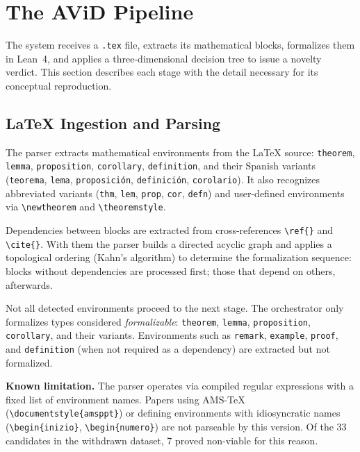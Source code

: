 \section{The AViD Pipeline}

\label{sec:pipeline}

The system receives a \texttt{.tex} file, extracts its mathematical blocks, formalizes them in Lean~4, and applies a three-dimensional decision tree to issue a novelty verdict. This section describes each stage with the detail necessary for its conceptual reproduction.

\subsection{LaTeX Ingestion and Parsing}

The parser extracts mathematical environments from the LaTeX source: \texttt{theorem}, \texttt{lemma}, \texttt{proposition}, \texttt{corollary}, \texttt{definition}, and their Spanish variants (\texttt{teorema}, \texttt{lema}, \texttt{proposición}, \texttt{definición}, \texttt{corolario}). It also recognizes abbreviated variants (\texttt{thm}, \texttt{lem}, \texttt{prop}, \texttt{cor}, \texttt{defn}) and user-defined environments via \verb|\newtheorem| and \verb|\theoremstyle|.

Dependencies between blocks are extracted from cross-references \verb|\ref{}| and \verb|\cite{}|. With them the parser builds a directed acyclic graph and applies a topological ordering (Kahn's algorithm) to determine the formalization sequence: blocks without dependencies are processed first; those that depend on others, afterwards.

Not all detected environments proceed to the next stage. The orchestrator only formalizes types considered \textit{formalizable}: \texttt{theorem}, \texttt{lemma}, \texttt{proposition}, \texttt{corollary}, and their variants. Environments such as \texttt{remark}, \texttt{example}, \texttt{proof}, and \texttt{definition} (when not required as a dependency) are extracted but not formalized.

\textbf{Known limitation.} The parser operates via compiled regular expressions with a fixed list of environment names. Papers using AMS-\TeX{} (\verb|\documentstyle{amsppt}|) or defining environments with idiosyncratic names (\verb|\begin{inizio}|, \verb|\begin{numero}|) are not parseable by this version. Of the 33 candidates in the withdrawn dataset, 7 proved non-viable for this reason.

